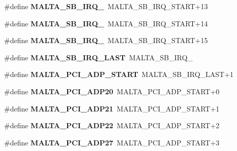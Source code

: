 \begin{DoxyCompactItemize}
\#define {\bfseries M\+A\+L\+T\+A\+\_\+\+S\+B\+\_\+\+I\+R\+Q\+\_}~M\+A\+L\+T\+A\+\_\+\+S\+B\+\_\+\+I\+R\+Q\+\_\+\+S\+T\+A\+RT+13
\item 
\mbox{\label{group__bsp__interrupt_ga6131d858af926914ea27b12d20f33dc0}} 
\#define {\bfseries M\+A\+L\+T\+A\+\_\+\+S\+B\+\_\+\+I\+R\+Q\+\_}~M\+A\+L\+T\+A\+\_\+\+S\+B\+\_\+\+I\+R\+Q\+\_\+\+S\+T\+A\+RT+14
\item 
\mbox{\label{group__bsp__interrupt_ga5f8be3f37348cbb6898bea4286531de2}} 
\#define {\bfseries M\+A\+L\+T\+A\+\_\+\+S\+B\+\_\+\+I\+R\+Q\+\_}~M\+A\+L\+T\+A\+\_\+\+S\+B\+\_\+\+I\+R\+Q\+\_\+\+S\+T\+A\+RT+15
\item 
\mbox{\label{group__bsp__interrupt_ga9d7cac55865b33445b4e021a255f0101}} 
\#define {\bfseries M\+A\+L\+T\+A\+\_\+\+S\+B\+\_\+\+I\+R\+Q\+\_\+\+L\+A\+ST}~M\+A\+L\+T\+A\+\_\+\+S\+B\+\_\+\+I\+R\+Q\+\_
\item 
\mbox{\label{group__bsp__interrupt_ga4e2745f8310187f9b1a659dc75cae15f}} 
\#define {\bfseries M\+A\+L\+T\+A\+\_\+\+P\+C\+I\+\_\+\+A\+D\+P\+\_\+\+S\+T\+A\+RT}~M\+A\+L\+T\+A\+\_\+\+S\+B\+\_\+\+I\+R\+Q\+\_\+\+L\+A\+ST+1
\item 
\mbox{\label{group__bsp__interrupt_gab7f9fedc4c61d405e910afe845b590f4}} 
\#define {\bfseries M\+A\+L\+T\+A\+\_\+\+P\+C\+I\+\_\+\+A\+D\+P20}~M\+A\+L\+T\+A\+\_\+\+P\+C\+I\+\_\+\+A\+D\+P\+\_\+\+S\+T\+A\+RT+0
\item 
\mbox{\label{group__bsp__interrupt_gadc5d3e2b78577660220ec33a762e5388}} 
\#define {\bfseries M\+A\+L\+T\+A\+\_\+\+P\+C\+I\+\_\+\+A\+D\+P21}~M\+A\+L\+T\+A\+\_\+\+P\+C\+I\+\_\+\+A\+D\+P\+\_\+\+S\+T\+A\+RT+1
\item 
\mbox{\label{group__bsp__interrupt_ga274819deb6ff2d364babf39a66e31607}} 
\#define {\bfseries M\+A\+L\+T\+A\+\_\+\+P\+C\+I\+\_\+\+A\+D\+P22}~M\+A\+L\+T\+A\+\_\+\+P\+C\+I\+\_\+\+A\+D\+P\+\_\+\+S\+T\+A\+RT+2
\item 
\mbox{\label{group__bsp__interrupt_gafae50273aefe98ee500c7d8e6b82cb91}} 
\#define {\bfseries M\+A\+L\+T\+A\+\_\+\+P\+C\+I\+\_\+\+A\+D\+P27}~M\+A\+L\+T\+A\+\_\+\+P\+C\+I\+\_\+\+A\+D\+P\+\_\+\+S\+T\+A\+RT+3

\end{DoxyCompactItemize}
